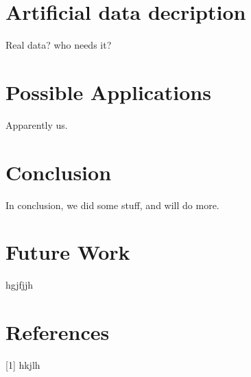 \documentclass{article}
\begin{document}
\section{Artificial data decription}
Real data? who needs it?
\\
\section{Possible Applications}
Apparently us.
\\
\section{Conclusion}
In conclusion, we did some stuff, and will do more.
\\
\section{Future Work}
hgjfjjh

\section*{References}


[1] hkjlh
\end{document}
